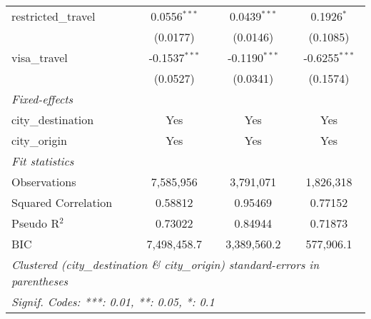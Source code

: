 \begin{tabular}{lccc}
   restricted\_travel                & 0.0556$^{***}$  & 0.0439$^{***}$  & 0.1926$^{*}$\\   
                                     & (0.0177)        & (0.0146)        & (0.1085)\\   
   visa\_travel                      & -0.1537$^{***}$ & -0.1190$^{***}$ & -0.6255$^{***}$\\   
                                     & (0.0527)        & (0.0341)        & (0.1574)\\   
   \midrule
   \emph{Fixed-effects}\\
   city\_destination                 & Yes             & Yes             & Yes\\  
   city\_origin                      & Yes             & Yes             & Yes\\  
   \midrule
   \emph{Fit statistics}\\
   Observations                      & 7,585,956       & 3,791,071       & 1,826,318\\  
   Squared Correlation               & 0.58812         & 0.95469         & 0.77152\\  
   Pseudo R$^2$                      & 0.73022         & 0.84944         & 0.71873\\  
   BIC                               & 7,498,458.7     & 3,389,560.2     & 577,906.1\\  
   \midrule \midrule
   \multicolumn{4}{l}{\emph{Clustered (city\_destination \& city\_origin) standard-errors in parentheses}}\\
   \multicolumn{4}{l}{\emph{Signif. Codes: ***: 0.01, **: 0.05, *: 0.1}}\\
\end{tabular}
\par\endgroup



